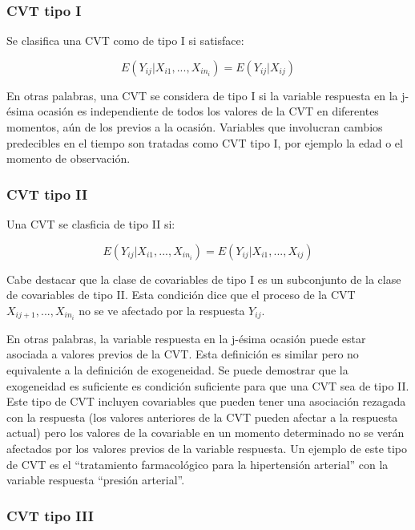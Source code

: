 \documentclass[12pt]{article}
\begin{document}
\subsubsection{CVT tipo I}

Se clasifica una CVT como de tipo I si satisface:

\begin{equation}
	\label{CVT tipo I}
	E(Y_{ij}|X_{i1}, ..., X_{in_i}) = E(Y_{ij}|X_{ij})
\end{equation}

En otras palabras, una CVT se considera de tipo I si la variable respuesta en la j-ésima ocasión es independiente de
todos los valores de la CVT en diferentes momentos, aún de los previos a la ocasión. Variables que involucran cambios
predecibles en el tiempo son tratadas como CVT tipo I, por ejemplo la edad o el momento de observación.

\subsubsection{CVT tipo II}

Una CVT se clasficia de tipo II si:

\begin{equation}
	\label{CVT tipo II}
	E(Y_{ij}|X_{i1}, ..., X_{in_i}) = E(Y_{ij}|X_{i1}, ..., X_{ij})
\end{equation}

Cabe destacar que la clase de covariables de tipo I es un subconjunto de la clase de covariables de tipo II. Esta
condición dice que el proceso de la CVT $X_{ij+1}, ..., X_{in_i}$ no se ve afectado por la respuesta $Y_{ij}$.

En otras palabras, la variable respuesta en la j-ésima ocasión puede estar asociada a valores previos de la CVT. Esta
definición es similar pero no equivalente a la definición de exogeneidad. Se puede demostrar que la exogeneidad es
suficiente es condición suficiente para que una CVT sea de tipo II. Este tipo de CVT incluyen covariables que pueden tener
una asociación rezagada con la respuesta (los valores anteriores de la CVT pueden afectar a la respuesta actual) pero los
valores de la covariable en un momento determinado no se verán afectados por los valores previos de la variable respuesta.
Un ejemplo de este tipo de CVT es el ``tratamiento farmacológico para la hipertensión arterial'' con la variable respuesta
``presión arterial''.

\subsubsection{CVT tipo III}
\end{document}

